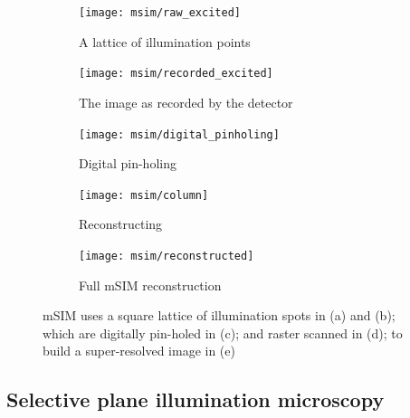 \begin{figure}
  \centering
  \begin{subfigure}[t]{0.185\textwidth}
    \centering
    \texttt{[image: msim/raw\_excited]}
    \caption{A lattice of illumination points}\label{fig:msim/raw_excited}
  \end{subfigure}\hfill
  \begin{subfigure}[t]{0.185\textwidth}
    \centering
    \texttt{[image: msim/recorded\_excited]}
    \caption{The image as recorded by the detector}\label{fig:msim/recorded_excited}
  \end{subfigure}\hfill
  \begin{subfigure}[t]{0.185\textwidth}
    \centering
    \texttt{[image: msim/digital\_pinholing]}
    \caption{Digital pin-holing}\label{fig:msim/digital_pinholing}
  \end{subfigure}\hfill
  \begin{subfigure}[t]{0.185\textwidth}
    \centering
    \texttt{[image: msim/column]}
    \caption{Reconstructing}\label{fig:msim/column}
  \end{subfigure}\hfill
  \begin{subfigure}[t]{0.185\textwidth}
    \centering
    \texttt{[image: msim/reconstructed]}
    \caption{Full mSIM reconstruction}\label{fig:msim/reconstructed}
  \end{subfigure} %
  \caption{\gls{mSIM} uses a square lattice of illumination spots in (a) and (b); which are digitally pin-holed in (c); and raster scanned in (d); to build a super-resolved image in (e)}\label{fig:mSIM}
\end{figure}



\subsection{Selective plane illumination microscopy}

